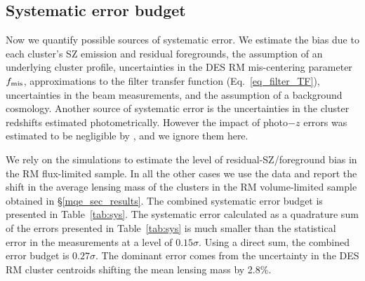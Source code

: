 \subsection{Systematic error budget}\label{mqe_sec_systematics}

Now we quantify possible sources of systematic error. %
 We estimate the bias due to each cluster's SZ emission and residual foregrounds, the assumption of an underlying cluster profile, uncertainties in the DES RM mis-centering parameter $f_{\rm mis}$, approximations to the filter transfer function (Eq.~\ref{eq_filter_TF}), uncertainties in the beam measurements, and the assumption of a background cosmology.
Another source of systematic error is the uncertainties in the cluster redshifts estimated photometrically.
However the impact of photo$-z$ errors was estimated to be negligible by \cite{raghunathan17a}, and we ignore them here.

We rely on the \cite{sehgal10} simulations to estimate the level of residual-SZ/foreground bias in the RM \whichyear{} flux-limited sample.
In all the other cases we use the data and report the shift in the average lensing mass of the clusters in the RM \whichyear{} volume-limited sample obtained in \S\ref{mqe_sec_results}. %
The combined systematic error budget is presented in Table~\ref{tab:sys}.
The systematic error calculated as a quadrature sum of the errors presented in Table~\ref{tab:sys} is much smaller than the statistical error in the measurements at a level of $0.15\sigma$. 
Using a direct sum, the combined error budget is $0.27\sigma$.
The dominant error comes from the uncertainty in the DES RM cluster centroids shifting the mean lensing mass by 2.8\%. 

